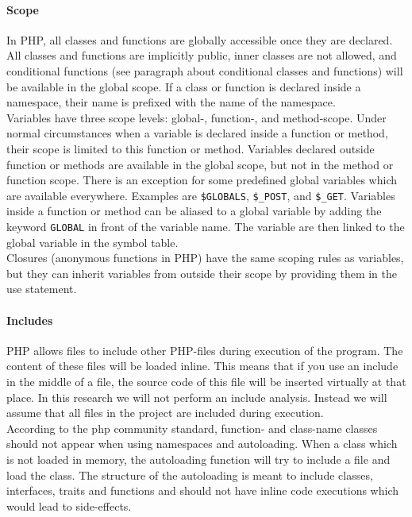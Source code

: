 \documentclass[../main.tex]{subfiles}
\begin{document}
    \paragraph{Scope}
    In PHP, all classes and functions are globally accessible once they are declared.
    All classes and functions are implicitly public, inner classes are not allowed, and conditional functions (see paragraph about conditional classes and functions) will be available in the global scope.
    If a class or function is declared inside a namespace, their name is prefixed with the name of the namespace.
    \\
    Variables have three scope levels: global-, function-, and method-scope.
    Under normal circumstances when a variable is declared inside a function or method, their scope is limited to this function or method.
    Variables declared outside function or methods are available in the global scope, but not in the method or function scope.
    There is an exception for some predefined global variables which are available everywhere. 
    Examples are \texttt{\$GLOBALS}, \texttt{\$\_POST}, and \texttt{\$\_GET}. 
    Variables inside a function or method can be aliased to a global variable by adding the keyword \texttt{GLOBAL} in front of the variable name.
    The variable are then linked to the global variable in the symbol table\footnotemark.
    \\
    Closures (anonymous functions in PHP) have the same scoping rules as variables, but they can inherit variables from outside their scope by providing them in the use statement. 
    
    \paragraph{Includes}
    PHP allows files to include other PHP-files during execution of the program. 
    The content of these files will be loaded inline. 
    This means that if you use an include in the middle of a file, the source code of this file will be inserted virtually at that place.
    In this research we will not perform an include analysis.
    Instead we will assume that all files in the project are included during execution. 
    \\
    According to the php community standard\footnotemark, function- and class-name classes should not appear when using namespaces and autoloading.
    When a class which is not loaded in memory, the autoloading function will try to include a file and load the class.
    The structure of the autoloading is meant to include classes, interfaces, traits and functions and should not have inline code executions which would lead to side-effects.
    
\end{document}
